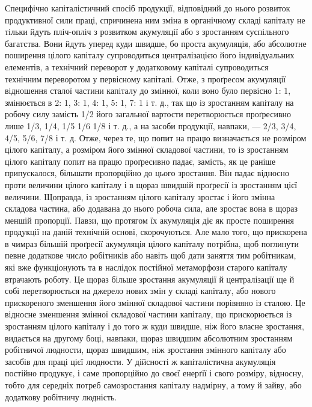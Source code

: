 Специфічно капіталістичний спосіб продукції, відповідний
до нього розвиток продуктивної сили праці, спричинена ним
зміна в органічному складі капіталу не тільки йдуть пліч-опліч
з розвитком акумуляції або з зростанням суспільного багатства.
Вони йдуть уперед куди швидше, бо проста акумуляція,
або абсолютне поширення цілого капіталу супроводиться централізацією
його індивідуальних елементів, а технічний переворот
у додатковому капіталі супроводиться технічним переворотом
у первісному капіталі. Отже, з проґресом акумуляції
відношення сталої частини капіталу до змінної, коли воно було
первісно 1: 1, змінюється в 2: 1, 3: 1, 4: 1, 5: 1, 7: 1 і т. д.,
так що із зростанням капіталу на робочу силу замість 1/2 його
загальної вартости перетворюється проґресивно лише 1/3, 1/4,
1/5 1/6 1/8 і т. д., а на засоби продукції, навпаки, — 2/3, 3/4, 4/5,
5/6, 7/8 і т. д. Отже, через те, що попит на працю визначається не
розміром цілого капіталу, а розміром його змінної складової
частини, то із зростанням цілого капіталу попит на працю проґресивно
падає, замість, як це раніше припускалося, більшати
пропорційно до цього зростання. Він падає відносно проти величини
цілого капіталу і в щораз швидшій проґресії із зростанням
цієї величини. Щоправда, із зростанням цілого капіталу зростає
і його змінна складова частина, або додавана до нього робоча
сила, але зростає вона в щораз меншій пропорції. Павзи, що протягом
їх акумуляція діє як просте поширення продукції на
даній технічній основі, скорочуються. Але мало того, що прискорена
в чимраз більшій проґресії акумуляція цілого капіталу
потрібна, щоб поглинути певне додаткове число робітників або
навіть щоб дати заняття тим робітникам, які вже функціонують
та в наслідок постійної метаморфози старого капіталу втрачають
роботу. Це щораз більше зростання акумуляції й централізації
ще й собі перетворюється на джерело нових змін у складі капіталу,
або нового прискореного зменшення його змінної складової
частини порівняно із сталою. Це відносне зменшення змінної
складової частини капіталу, що прискорюється із зростанням
цілого капіталу і до того ж куди швидше, ніж його власне зростання,
видається на другому боці, навпаки, щораз швидшим
абсолютним зростанням робітничої людности, щораз швидшим,
ніж зростання змінного капіталу або засобів для праці цієї людности.
У дійсності ж капіталістична акумуляція постійно продукує,
і саме пропорційно до своєї енерґії і свого розміру, відносну,
тобто для середніх потреб самозростання капіталу надмірну,
а тому й зайву, або додаткову робітничу людність.

